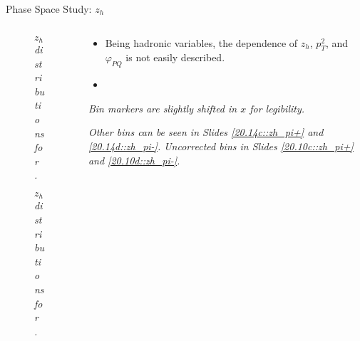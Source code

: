 \begin{frame}{Phase Space Study: $z_h$}
    \label{12.14::zh}

    \begin{columns}[onlytextwidth,T]

    \begin{column}{.44\linewidth}
        \vspace{-15pt}
        \begin{center}
            \begin{figure}[t]
                \scriptsize{\textit{$z_h$ distributions for \ef{$\pi^-$}.}}
            \end{figure}

            \vspace{-9pt}
            \begin{figure}[t]
                \scriptsize{\textit{$z_h$ distributions for \ef{$\pi^+$}.}}
            \end{figure}
        \end{center}
    \end{column}

    \begin{column}{.54\linewidth}
        \begin{itemize}
            \item
                Being hadronic variables, the \ef{$\theta$} dependence of $z_h$, $p_T^2$, and $\varphi_{PQ}$ is not easily described.

            \vspace{12pt}
            \item
        \end{itemize}

        \vspace{105pt}

        \begin{flushright}
            \tiny{\textit{Bin markers are slightly shifted in $x$ for legibility.}}

            \tiny{\textit{
                Other bins can be seen in Slides \textcolor{efd_purple}{\ref{20.14c::zh_pi+}} and \textcolor{efd_purple}{\ref{20.14d::zh_pi-}}.
                Uncorrected bins in Slides \textcolor{efd_purple}{\ref{20.10c::zh_pi+}} and \textcolor{efd_purple}{\ref{20.10d::zh_pi-}}.
            }}
        \end{flushright}
    \end{column}

    \end{columns}
\end{frame}

